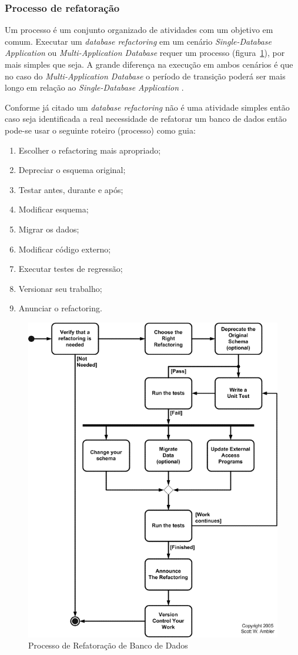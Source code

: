 \documentclass[10pt]{article}
\begin{document}
	
\subsubsection{Processo de refatoração}
	Um processo é um conjunto organizado de atividades com um objetivo em comum. Executar um \textit{database refactoring} em um cenário \textit{Single-Database Application} ou \textit{Multi-Application Database} requer um processo (figura~\ref{figura:3}), por mais simples que seja. A grande diferença na execução em ambos cenários é que no caso do \textit{Multi-Application Database} o período de transição poderá ser mais longo em relação ao \textit{Single-Database Application} \cite{Ambler:RefactoringDatabases}.

	Conforme já citado um \textit{database refactoring} não é uma atividade simples então caso seja identificada a real necessidade de refatorar um banco de dados então pode-se usar o seguinte roteiro (processo) como guia:
	\begin{enumerate}
		\item Escolher o refactoring mais apropriado;
		\item Depreciar o esquema original;
		\item Testar antes, durante e após;
		\item Modificar esquema;
		\item Migrar os dados;
		\item Modificar código externo;
		\item Executar testes de regressão;
		\item Versionar seu trabalho;
		\item Anunciar o refactoring.
	\end{enumerate}

	\begin{figure}[ht]
		\centering
		\includegraphics[width=.5\textwidth]{img/databaseRefactoringProcess.png}
		\caption{Processo de Refatoração de Banco de Dados}
		\label{figura:3}
	\end{figure}
\end{document}
